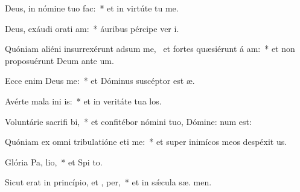 \item Deus, in nómine tuo   fac:~* et in virtúte tu  me.
\item Deus, exáudi orati am:~* áuribus pércipe ver  i.
\item Quóniam aliéni insurrexérunt adsum me,~\pscross{} et fortes quæsiérunt á am:~* et non proposuérunt Deum ante  um.
\item Ecce enim Deus  me:~* et Dóminus suscéptor est  æ.
\item Avérte mala ini is:~* et in veritáte tua  los.
\item Voluntárie sacrifi bi,~* et confitébor nómini tuo, Dómine:  num est:
\item Quóniam ex omni tribulatióne eti me:~* et super inimícos meos despéxit  us.
\item Glória Pa,  lio,~* et Spi to.
\item Sicut erat in princípio, et ,  per,~* et in sǽcula sæ. men.

